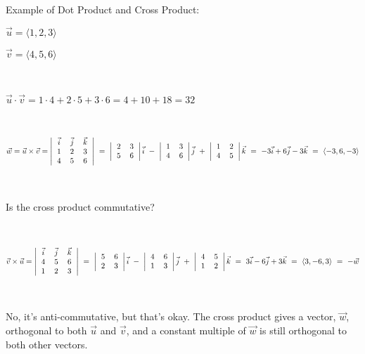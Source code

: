 \documentclass[12pt]{article}
\begin{document}
\begin{spacing}{1.2}
Example of Dot Product and Cross Product:

$\vec{u} = \langle 1,2,3 \rangle$

$\vec{v} = \langle 4,5,6 \rangle$

\

$\vec{u} \cdot \vec{v} = 1 \cdot 4 + 2 \cdot 5 + 3 \cdot 6 = 4 + 10 + 18 = 32$

\

$\displaystyle \vec{w} = \vec{u} \times \vec{v} = 
	\left|
	\begin{tabular}{*3{>{$}c<{$}}}
		\vec{i} & \vec{j} & \vec{k} \cr
		1 & 2 & 3 \cr
		4 & 5 & 6 \cr
	\end{tabular}
	\right|
\ = \
	\left|
	\begin{tabular}{cc}
		2 & 3 \cr
		5 & 6 \cr
	\end{tabular}
	\right|
	\vec{i}
\ - \	
	\left|
	\begin{tabular}{cc}
		1 & 3 \cr
		4 & 6 \cr
	\end{tabular}
	\right|
	\vec{j}
\ + \ 
	\left|
	\begin{tabular}{cc}
		1 & 2 \cr
		4 & 5 \cr
	\end{tabular}
	\right|
	\vec{k}
\ = \
	-3\vec{i} + 6 \vec{j} - 3 \vec{k}
\ = \
	\langle -3,6,-3 \rangle
$

\

Is the cross product commutative?

\

$\displaystyle\vec{v} \times \vec{u} = 
	\left|
	\begin{tabular}{*3{>{$}c<{$}}}
		\vec{i} & \vec{j} & \vec{k} \cr
		4 & 5 & 6 \cr
		1 & 2 & 3 \cr
	\end{tabular}
	\right|
\ = \
	\left|
	\begin{tabular}{cc}
		5 & 6 \cr
		2 & 3 \cr
	\end{tabular}
	\right|
	\vec{i}
\ - \	
	\left|
	\begin{tabular}{cc}
		4 & 6 \cr
		1 & 3 \cr
	\end{tabular}
	\right|
	\vec{j}
\ + \ 
	\left|
	\begin{tabular}{cc}
		4 & 5 \cr
		1 & 2 \cr
	\end{tabular}
	\right|
	\vec{k}
\ = \
	3\vec{i} - 6 \vec{j} + 3 \vec{k}
\ = \
	\langle 3,-6,3 \rangle
\ = \ -\vec{w}
$

\

No, it's anti-commutative, but that's okay.  The cross product gives a vector, $\vec{w}$, orthogonal to both $\vec{u}$ and $\vec{v}$, and a constant multiple of $\vec{w}$ is still orthogonal to both other vectors.  


\end{spacing}
\end{document}
